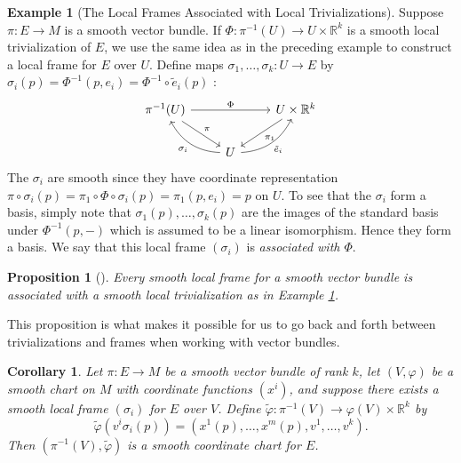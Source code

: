 \documentclass[reqno]{amsart}
\newtheorem{proposition}[theorem]{Proposition}
\newtheorem{corollary}[theorem]{Corollary}
\theoremstyle{definition}
\newtheorem{example}[theorem]{Example}
\theoremstyle{remark}
\begin{document}
    \begin{example}[The Local Frames Associated with Local
        Trivializations]\label{Local-Frames-Local-Trivializations}
        Suppose $\pi \colon E \to M$ is a smooth
        vector bundle. If
        $\Phi \colon \pi^{-1}(U) \to U \times \mathbb{R}^{k}$ 
        is a smooth local trivialization of $E$, we use
        the same idea as in the preceding example to
        construct a local frame for $E$ over $U$. Define
        maps $\sigma_1, \ldots, \sigma_k \colon
        U \to E$ by
        $\sigma_i (p) = \Phi^{-1} (p, e_i) = 
        \Phi^{-1} \circ \tilde{e}_i(p)$ :
        \begin{equation*}
        \begin{tikzcd}
            \pi^{-1}(U) \ar[dr, "\pi"] \ar[rr, "\Phi"]
            && U \times \mathbb{R}^{k} \ar[dl, "\pi_1"] \\
            & U \ar[lu, "\sigma_i", bend left] 
            \ar[ru, "\tilde{e}_i"', bend right] &
        \end{tikzcd}
        \end{equation*}
        The $\sigma_i$ are smooth since they
        have coordinate representation
        $\pi \circ \sigma_i (p) = \pi_1 \circ \Phi \circ \sigma_i
        (p) = \pi_1 \left( p,e_i \right) = p$ on
        $U$. To see that
        the $\sigma_i$ form a basis, simply note that
        $\sigma_1(p), \ldots, \sigma_k(p)$
        are the images of the standard basis under
        $\Phi^{-1}(p,-)$ which is assumed to be a linear
        isomorphism. Hence they form a basis.
        We say that this local frame
        $\left( \sigma_i \right) $ is \textit{associated
        with $\Phi$}.
    \end{example}

    \begin{proposition}[]
        Every smooth local frame for a smooth vector bundle
        is associated with a smooth local trivialization as
        in Example \ref{Local-Frames-Local-Trivializations}.
    \end{proposition}

    This proposition is what makes it possible for us
    to go back and forth between trivializations and
    frames when working with vector bundles.

    \begin{corollary}
        Let $\pi \colon E \to M$ be a smooth
        vector bundle of rank $k$, let
        $\left( V, \varphi  \right) $ be a smooth chart
        on $M$ with coordinate functions
        $\left( x^{i} \right) $, and suppose
        there exists a smooth local frame
        $\left( \sigma_i \right) $ for $E$ over $V$.
        Define $\tilde{\varphi } \colon
        \pi^{-1}(V) \to \varphi (V) \times \mathbb{R}^{k}$ 
        by
        \[
        \tilde{\varphi }\left( v^{i}\sigma_i(p) \right) 
        = \left( x^{1}(p), \ldots, x^{m}(p),
        v^{1}, \ldots, v^{k} \right) .
        \]
        Then $\left( \pi^{-1}(V), \tilde{\varphi } \right) $ 
        is a smooth coordinate chart for $E$.
    \end{corollary}
\end{document}
